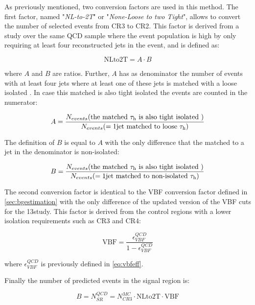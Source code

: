 As previously mentioned, two conversion factors are used in this method. The first factor, named "\textit{NL-to-2T}" or "\textit{None-Loose to two Tight}", allows to convert the number of selected events from CR3 to CR2. This factor is derived from a study over the same QCD sample where the event population is high by only requiring at least four reconstructed jets in the event, and is defined as:

\begin{equation}
\text{NLto2T} = A \cdot B
\end{equation}

where $A$ and $B$ are ratios. Further, $A$ has as denominator the number of events with at least four jets where at least one of these jets is matched with a loose isolated \hadtau. In case this matched \hadtau is also tight isolated the events are counted in the numerator:

\begin{equation}
A = \dfrac{N_{events}(\text{the matched }\tau_{\text{h}}\text{ is also tight isolated })}{N_{events}(= 1\text{jet matched to loose }\tau_{\text{h}})}
\end{equation}

The definition of $B$ is equal to $A$ with the only difference that the \hadtau matched to a jet in the denominator is non-isolated:

\begin{equation}
B = \dfrac{N_{events}(\text{the matched }\tau_{\text{h}}\text{ is also tight isolated })}{N_{events}(= 1\text{jet matched to non-isolated }\tau_{\text{h}})}
\end{equation}

The second conversion factor is identical to the VBF conversion factor defined in \autoref{sec:bgestimation} with the only difference of the updated version of the VBF cuts for the 13\tev study. This factor is derived from the control regions with a lower \hadtau isolation requirements such as CR3 and CR4:

\begin{equation}
\text{VBF} = \frac{\epsilon^{QCD}_{VBF}}{1 - \epsilon^{QCD}_{VBF}}
\end{equation}

where $\epsilon^{QCD}_{VBF}$ is previously defined in \autoref{eq:vbfeff}. 

Finally the number of predicted events in the signal region is:

\begin{equation}
B = N^{QCD}_{SR} = N^{MC}_{CR3}  \cdot \text{NLto2T} \cdot \text{VBF}
\label{eq::qcdbgpred_13tev}
\end{equation}

